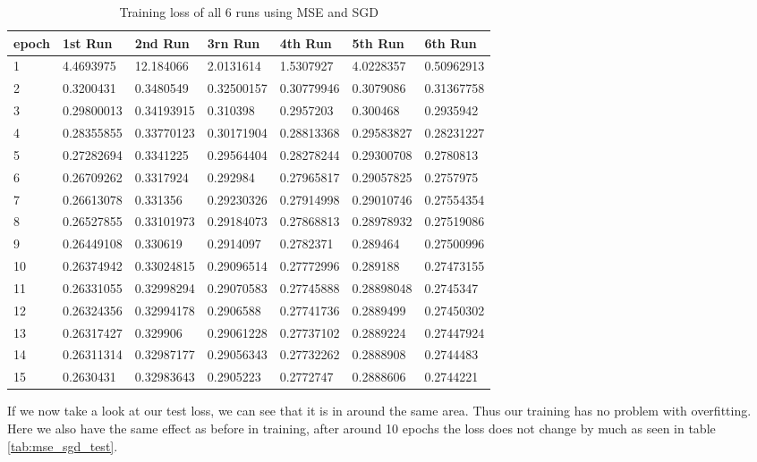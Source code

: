 \begin{table}[!ht]
    \centering
    \begin{tabular}{|l||l||l||l||l||l||l|}
    \hline
        epoch & 1st Run & 2nd Run & 3rn Run & 4th Run & 5th Run & 6th Run \\ \hline
        1 & 4.4693975 & 12.184066 & 2.0131614 & 1.5307927 & 4.0228357 & 0.50962913 \\ \hline
        2 & 0.3200431 & 0.3480549 & 0.32500157 & 0.30779946 & 0.3079086 & 0.31367758 \\ \hline
        3 & 0.29800013 & 0.34193915 & 0.310398 & 0.2957203 & 0.300468 & 0.2935942 \\ \hline
        4 & 0.28355855 & 0.33770123 & 0.30171904 & 0.28813368 & 0.29583827 & 0.28231227 \\ \hline
        5 & 0.27282694 & 0.3341225 & 0.29564404 & 0.28278244 & 0.29300708 & 0.2780813 \\ \hline
        6 & 0.26709262 & 0.3317924 & 0.292984 & 0.27965817 & 0.29057825 & 0.2757975 \\ \hline
        7 & 0.26613078 & 0.331356 & 0.29230326 & 0.27914998 & 0.29010746 & 0.27554354 \\ \hline
        8 & 0.26527855 & 0.33101973 & 0.29184073 & 0.27868813 & 0.28978932 & 0.27519086 \\ \hline
        9 & 0.26449108 & 0.330619 & 0.2914097 & 0.2782371 & 0.289464 & 0.27500996 \\ \hline
        10 & 0.26374942 & 0.33024815 & 0.29096514 & 0.27772996 & 0.289188 & 0.27473155 \\ \hline
        11 & 0.26331055 & 0.32998294 & 0.29070583 & 0.27745888 & 0.28898048 & 0.2745347 \\ \hline
        12 & 0.26324356 & 0.32994178 & 0.2906588 & 0.27741736 & 0.2889499 & 0.27450302 \\ \hline
        13 & 0.26317427 & 0.329906 & 0.29061228 & 0.27737102 & 0.2889224 & 0.27447924 \\ \hline
        14 & 0.26311314 & 0.32987177 & 0.29056343 & 0.27732262 & 0.2888908 & 0.2744483 \\ \hline
        15 & 0.2630431 & 0.32983643 & 0.2905223 & 0.2772747 & 0.2888606 & 0.2744221 \\ \hline
    \end{tabular}
    \caption{\label{tab:mse_sgd_train}Training loss of all 6 runs using MSE and SGD}
\end{table}

If we now take a look at our test loss, we can see that it is in around the same area. Thus our training
has no problem with overfitting. Here we also have the same effect as before in training, after around 10 epochs 
the loss does not change by much as seen in table \ref{tab:mse_sgd_test}.


